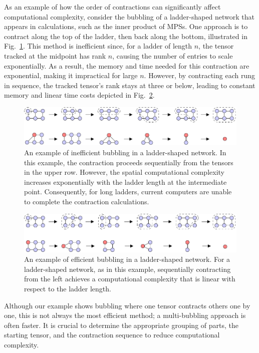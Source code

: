 \documentclass[12pt,dvipdfmx,twoside,openright]{report}
\begin{document}
As an example of how the order of contractions can significantly affect computational complexity, consider the bubbling of a ladder-shaped network that appears in calculations, such as the inner product of MPSs.
One approach is to contract along the top of the ladder, then back along the bottom, illustrated in Fig.~\ref{fig:bubbling1}.
This method is inefficient since, for a ladder of length $n$, the tensor tracked at the midpoint has rank $n$, causing the number of entries to scale exponentially.
As a result, the memory and time needed for this contraction are exponential, making it impractical for large $n$.
However, by contracting each rung in sequence, the tracked tensor's rank stays at three or below, leading to constant memory and linear time costs depicted in Fig.~\ref{fig:bubbling2}.
\begin{figure}
    \centering
    \includegraphics[width=\linewidth]{fig-bubbling1.pdf}
    \caption{An example of inefficient bubbling in a ladder-shaped network.
    In this example, the contraction proceeds sequentially from the tensors in the upper row. 
    However, the spatial computational complexity increases exponentially with the ladder length at the intermediate point. 
    Consequently, for long ladders, current computers are unable to complete the contraction calculations.}
    \label{fig:bubbling1}
\end{figure}
\begin{figure}
    \centering
    \includegraphics[width=\linewidth]{fig-bubbling2.pdf}
    \caption{An example of efficient bubbling in a ladder-shaped network.
    For a ladder-shaped network, as in this example, sequentially contracting from the left achieves a computational complexity that is linear with respect to the ladder length.}
    \label{fig:bubbling2}
\end{figure}



Although our example shows bubbling where one tensor contracts others one by one, this is not always the most efficient method; a multi-bubbling approach is often faster.
It is crucial to determine the appropriate grouping of parts, the starting tensor, and the contraction sequence to reduce computational complexity.
\end{document}
